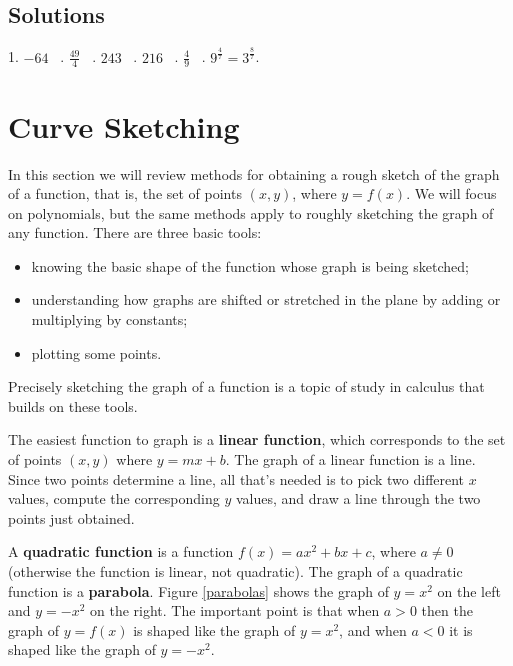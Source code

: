 \documentclass[11pt]{book}               %
\begin{document}
\subsection{Solutions} 
1.  $-64$ \  . $\frac{49}{4}$ \ .  $243$ \  .  $216$ \ . $\frac{4}{9}$ \ . $9^\frac{4}{7} = 3^\frac{8}{7}$. %

\newpage
\section{Curve Sketching}

In this section we will review methods for obtaining a rough sketch of the graph of a function, that is, the set of points $(x, y)$, where $y = f(x)$.  
We will focus on polynomials, but the same methods apply to roughly sketching the graph of any function.
There are three basic tools:
\begin{itemize}
\item knowing the basic shape of the function whose graph is being sketched;
\item understanding how graphs are shifted or stretched in the plane by adding or multiplying by constants;
\item plotting some points.
\end{itemize}
Precisely sketching the graph of a function is a topic of study in calculus that builds on these tools.

The easiest function to graph is a \textbf{linear function}, which corresponds to the set of points $(x, y)$ where $y = mx + b$.  The graph of a linear function is a line.
Since two points determine a line, all that's needed is to pick two different $x$ values, compute the corresponding $y$ values, and draw a line through the two points just obtained.

A \textbf{quadratic function} is a function $f(x) = ax^2+bx+c$, where $a \neq 0$ (otherwise the function is linear, not quadratic).   The graph of a quadratic function is a \textbf{parabola}.
Figure \ref{parabolas} shows the graph of $y = x^2$ on the left and $y = -x^2$ on the right.
The important point is that when $a > 0$ then the graph of $y = f(x)$ is shaped like the graph of $y = x^2$, and 
when $a < 0$ it is shaped like the graph of $y = -x^2$.
\end{document}
